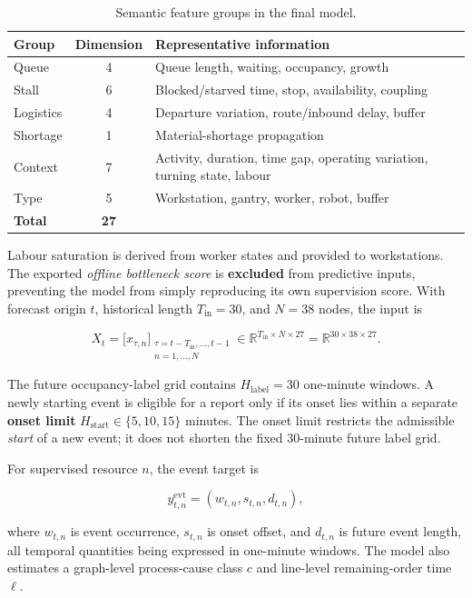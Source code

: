 \begin{table}[!htbp]
\centering
\caption{Semantic feature groups in the final model.}
\label{tab:features}
\small
\begin{tabularx}{\linewidth}{@{}l c X@{}}
\toprule
Group & Dimension & Representative information \\
\midrule
Queue & 4 & Queue length, waiting, occupancy, growth \\
Stall & 6 & Blocked/starved time, stop, availability, coupling \\
Logistics & 4 & Departure variation, route/inbound delay, buffer \\
Shortage & 1 & Material-shortage propagation \\
Context & 7 & Activity, duration, time gap, operating variation, turning state, labour \\
Type & 5 & Workstation, gantry, worker, robot, buffer \\
\midrule
\textbf{Total} & \textbf{27} & \\
\bottomrule
\end{tabularx}
\end{table}
\FloatBarrier

Labour saturation is derived from worker states and provided to workstations. The exported \emph{offline bottleneck score} is \textbf{excluded} from predictive inputs, preventing the model from simply reproducing its own supervision score. With forecast origin \(t\), historical length \(T_{\mathrm{in}}=30\), and \(N=38\) nodes, the input is

\[
X_t=\bigl[x_{\tau,n}\bigr]_{\substack{\tau=t-T_{\mathrm{in}},\ldots,t-1\\n=1,\ldots,N}}
\in\mathbb{R}^{T_{\mathrm{in}}\times N\times27}
=\mathbb{R}^{30\times38\times27}.
\]

The future occupancy-label grid contains \(H_{\mathrm{label}}=30\) one-minute windows. A newly starting event is eligible for a report only if its onset lies within a separate \textbf{onset limit} \(H_{\mathrm{start}}\in\{5,10,15\}\) minutes. The onset limit restricts the admissible \emph{start} of a new event; it does not shorten the fixed 30-minute future label grid.

For supervised resource \(n\), the event target is

\[
y^{\mathrm{evt}}_{t,n}=(w_{t,n},s_{t,n},d_{t,n}),
\]

where \(w_{t,n}\) is event occurrence, \(s_{t,n}\) is onset offset, and \(d_{t,n}\) is future event length, all temporal quantities being expressed in one-minute windows. The model also estimates a graph-level process-cause class \(c\) and line-level remaining-order time \(\ell\).

